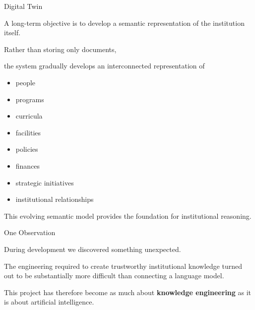 \documentclass[aspectratio=169]{beamer}
\begin{document}
\begin{frame}{Digital Twin}

A long-term objective is to develop a semantic representation
of the institution itself.

\vspace{0.5cm}

Rather than storing only documents,

the system gradually develops an interconnected representation of

\vspace{0.4cm}

\begin{itemize}

\item people

\item programs

\item curricula

\item facilities

\item policies

\item finances

\item strategic initiatives

\item institutional relationships

\end{itemize}

\vspace{0.2cm}

This evolving semantic model provides the foundation for
institutional reasoning.

\end{frame}

\begin{frame}{One Observation}

During development we discovered something unexpected.

\vspace{0.7cm}

\begin{center}

\Large

The engineering required to create trustworthy institutional
knowledge turned out to be substantially more difficult than
connecting a language model.

\end{center}

\vspace{0.8cm}

This project has therefore become as much about
\textbf{knowledge engineering}
as it is about artificial intelligence.

\end{frame}
\end{document}
